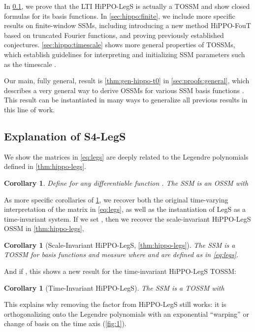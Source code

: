 \documentclass{article}
\newtheorem{corollary}[lemma]{Corollary}
\begin{document}
In \cref{sec:hippo:legs}, we prove that the LTI HiPPO-LegS is actually a TOSSM and show closed formulas for its basis functions.
In \cref{sec:hippo:finite}, we include more specific results on finite-window SSMs, including introducing a new method HiPPO-FouT based on truncated Fourier functions, and proving previously established conjectures.
\cref{sec:hippo:timescale} shows more general properties of TOSSMs, which establish guidelines for interpreting and initializing SSM parameters such as the timescale .


Our main, fully general, result is \cref{thm:gen-hippo-t0} in \cref{sec:proofs:general}, which describes a very general way to derive OSSMs for various SSM basis functions .
This result can be instantiated in many ways to generalize all previous results in this line of work.

\subsection{Explanation of S4-LegS}
\label{sec:hippo:legs}

We show the matrices  in \eqref{eq:legs}
are deeply related to the Legendre polynomials  defined in \cref{thm:hippo-legs}.


\begin{corollary}\label{cor:legs}
  Define  for any differentiable function . The SSM 
  is an OSSM with
  
\end{corollary}

As more specific corollaries of \cref{cor:legs}, we recover both the original time-varying interpretation of the matrix in  \eqref{eq:legs},
as well as the instantiation of LegS as a time-invariant system.
If we set , then we recover the scale-invariant HiPPO-LegS OSSM in \cref{thm:hippo-legs},
\begin{corollary}[Scale-Invariant HiPPO-LegS, \cref{thm:hippo-legs}]The SSM
   is a TOSSM for basis functions   and measure  where 
    and  are defined as in \eqref{eq:legs}.
\end{corollary}
And if , this shows a new result for the time-invariant HiPPO-LegS TOSSM:
\begin{corollary}[Time-Invariant HiPPO-LegS]\label{cor:legs-time}
 The SSM  is a TOSSM with
  
\end{corollary}

This explains why removing the  factor from HiPPO-LegS still works: it is orthogonalizing onto the Legendre polynomials with an exponential ``warping'' or change of basis on the time axis (\cref{fig:1}).
\end{document}
